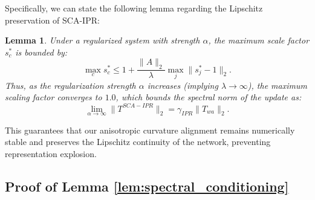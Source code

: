 \documentclass{article}
\theoremstyle{plain}
\newtheorem{lemma}[theorem]{Lemma}
\theoremstyle{definition}
\theoremstyle{remark}
\begin{document}
Specifically, we can state the following lemma regarding the Lipschitz preservation of SCA-IPR:
\begin{lemma}
Under a regularized system with strength $\alpha$, the maximum scale factor $s^*_c$ is bounded by:
\begin{equation}
    \max_{c} s^*_c \le 1 + \frac{\|A\|_2}{\lambda} \max_j \|s^*_j - 1\|_2.
\end{equation}
Thus, as the regularization strength $\alpha$ increases (implying $\lambda \to \infty$), the maximum scaling factor converges to $1.0$, which bounds the spectral norm of the update as:
\begin{equation}
    \lim_{\alpha \to \infty} \|T^{SCA-IPR}\|_2 = \gamma_{IPR} \|T_{wa}\|_2.
\end{equation}
\label{lem:lipschitz}
\end{lemma}
This guarantees that our anisotropic curvature alignment remains numerically stable and preserves the Lipschitz continuity of the network, preventing representation explosion.

\subsection{Proof of Lemma \ref{lem:spectral_conditioning}}
\label{sec:appendix_conditioning}
\end{document}
